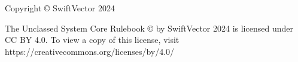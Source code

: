 
\vspace*{\fill}

\begin{center}
    Copyright © SwiftVector 2024
 
    \vspace{1in}

    The Unclassed System Core Rulebook © by SwiftVector 2024 is licensed under
    CC BY 4.0. To view a copy of this license, visit
    https://creativecommons.org/licenses/by/4.0/
\end{center}

\vspace*{\fill}

